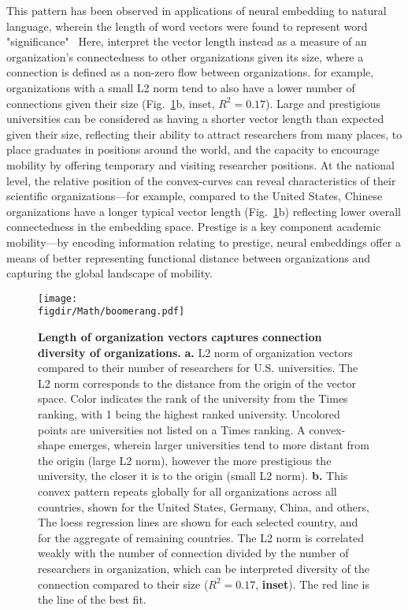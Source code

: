 \documentclass[12pt]{article} %
\def\figdir{../Figs}
\begin{document}
This pattern has been observed in applications of neural embedding to natural language, wherein the length of word vectors were found to represent word "significance"~\autocite{schakel2015measuring}
Here, interpret the vector length instead as a measure of an organization's connectedness to other organizations given its size, where a connection is defined as a non-zero flow between organizations.
for example, organizations with a small L2 norm tend to also have a lower number of connections given their size (Fig.~\ref{fig:length}b, inset, $R^{2} = 0.17$). 
Large and prestigious universities can be considered as having a shorter vector length than expected given their size, reflecting their ability to attract researchers from many places, to place graduates in positions around the world, and the capacity to encourage mobility by offering temporary and visiting researcher positions. 
At the national level, the relative position of the convex-curves can reveal characteristics of their scientific organizations—for example, compared to the United States, Chinese organizations have a longer typical vector length (Fig.~\ref{fig:length}b) reflecting lower overall connectedness in the embedding space. 
Prestige is a key component academic mobility—by encoding information relating to prestige, neural embeddings offer a means of better representing functional distance between organizations and capturing the global landscape of mobility. 


%
%
\begin{figure}[h!]
	\centering
	\texttt{[image: \\figdir/Math/boomerang.pdf]}
	\caption{
		\textbf{Length of organization vectors captures connection diversity of organizations.}
		\textbf{a.} L2 norm of organization vectors compared to their number of researchers for U.S. universities.
		The L2 norm corresponds to the distance from the origin of the vector space.
		Color indicates the rank of the university from the Times ranking, with 1 being the highest ranked university.
		Uncolored points are universities not listed on a Times ranking.
		A convex-shape emerges, wherein larger universities tend to more distant from the origin (large L2 norm), however the more prestigious the university, the closer it is to the origin (small L2 norm). 
		\textbf{b.} This convex pattern repeats globally for all organizations across all countries, shown for the United States, Germany, China, and others,
		The loess regression lines are shown for each selected country, and for the aggregate of remaining countries. 
		The L2 norm is correlated weakly with the number of connection divided by the number of researchers in organization, which can be interpreted diversity of the connection compared to their size ($R^{2} = 0.17$, \textbf{inset}).
		The red line is the line of the best fit.
	}
	\label{fig:length}
\end{figure}
\end{document}
